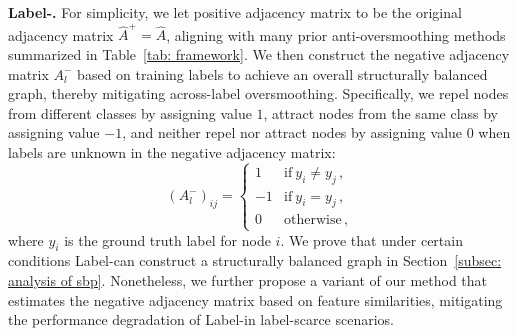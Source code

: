 \textbf{Label-\ours.} 
For simplicity, we let positive adjacency matrix to be the original adjacency matrix \(\hat{A}^+=\hat{A}\), aligning with many prior anti-oversmoothing methods summarized in Table~\ref{tab: framework}.
We then construct the negative adjacency matrix \(A_l^-\) based on training labels to achieve an overall structurally balanced graph, thereby mitigating across-label oversmoothing.
Specifically, we repel nodes from different classes by assigning value \(1\), attract nodes from the same class by assigning value \(-1\), and neither repel nor attract nodes by assigning value \(0\) when labels are unknown in the negative adjacency matrix:
\begin{equation}
\label{eq: label_neg}
    (A^-_l)_{ij}=
    \begin{cases}
      1 & \text{if} \ y_i \neq y_j\,, \\
      -1 & \text{if} \ y_i = y_j\,, \\
      0 & \text{otherwise}\,,
    \end{cases}
\end{equation}
where \(y_i\) is the ground truth label for node \(i\).
We prove that under certain conditions Label-\ours can construct a structurally balanced graph in Section~\ref{subsec: analysis of sbp}.
Nonetheless, 
we further propose a variant of our method that estimates the negative adjacency matrix based on feature similarities, mitigating the performance degradation of Label-\ours in label-scarce scenarios.

